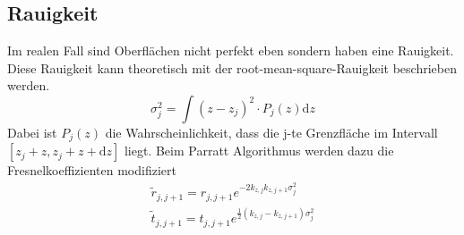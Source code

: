     \subsection{Rauigkeit}
        Im realen Fall sind Oberflächen nicht perfekt eben sondern haben eine Rauigkeit.
        Diese Rauigkeit kann theoretisch mit der root-mean-square-Rauigkeit beschrieben werden.
        \begin{equation}
            \sigma_j^2 = \int \left(z-z_j\right)^2\cdot P_j(z) \text{d}z        
        \end{equation}
        Dabei ist $P_j(z)$ die Wahrscheinlichkeit, dass die j-te Grenzfläche im Intervall $[z_j+z,z_j+z+\text{d}z]$ liegt.
        Beim Parratt Algorithmus werden dazu die Fresnelkoeffizienten modifiziert
        \begin{align}
            \label{eqn:rauheit}
            \tilde{r}_{j,j+1} = r_{j,j+1} e^{-2k_{z,j}k_{z,j+1} \sigma_j^2}\\
            \tilde{t}_{j,j+1} = t_{j,j+1} e^{ \frac{1}{2} \left(k_{z,j} -k_{z,j+1}\right)\sigma_j^2}
        \end{align}
